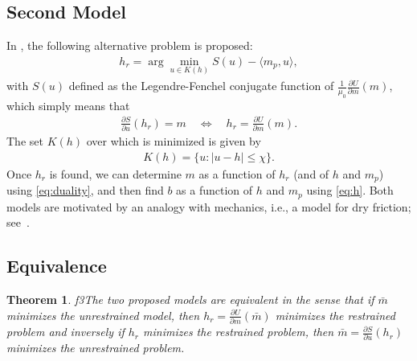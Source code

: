 \documentclass[12pt]{article}
\newtheorem{theorem}{Theorem}
\begin{document}
\subsection{Second Model}
%
In \cite{Prigozhin}, the following alternative problem is proposed:
\begin{align} \label{eq:prigozhin}
    h_r = \arg\min_{u \in K(h)} S(u) - \langle m_p, u\rangle,
\end{align}
with $S(u)$ defined as the Legendre-Fenchel conjugate function of $\frac{1}{\mu_0} \frac{\partial U}{\partial m}(m)$, which simply means that
\begin{align} \label{eq:duality}
    \frac{\partial S}{\partial u}(h_r) = m \quad \Leftrightarrow \quad h_r = \frac{\partial U}{\partial m}(m).
\end{align}
The set $K(h)$ over which is minimized is given by 
\begin{align} \label{eq:Kh}
    K(h) = \{ u : |u-h| \le \chi\}.
\end{align}
%
Once $h_r$ is found, we can determine $m$ as a function of $h_r$ (and of $h$ and $m_p$) using \eqref{eq:duality}, and then find $b$ as a function of $h$
and $m_p$ using \eqref{eq:h}.
%
Both models are motivated by an analogy with mechanics, i.e., a model for dry friction; see~\cite{Moreau}. 

\subsection{Equivalence}

\begin{theorem}
f3The two proposed models are equivalent in the sense that if $\bar m$ minimizes the unrestrained model, then $h_r = \frac{\partial U}{\partial m}(\bar m)$ minimizes the restrained problem and inversely if $h_r$ minimizes the restrained problem, then $\bar m = \frac{\partial S}{\partial u}(h_r)$ minimizes the unrestrained problem.
\end{theorem}
\end{document}
